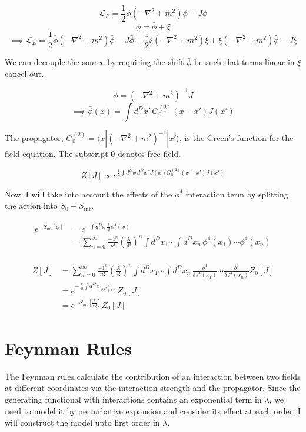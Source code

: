 $$\mathcal{L}_E=\frac{1}{2}\phi(-\nabla^2+m^2)\phi-J\phi$$
$$\phi=\bar\phi+\xi$$
$$\implies\mathcal{L}_E=\frac{1}{2}\bar\phi(-\nabla^2+m^2)\bar\phi-J\bar\phi+\frac{1}{2}\xi(-\nabla^2+m^2)\xi+\xi(-\nabla^2+m^2)\bar\phi-J\xi$$

\noindent We can decouple the source by requiring the shift $\bar\phi$ be such that terms linear in $\xi$ cancel out.

$$\bar\phi=(-\nabla^2+m^2)^{-1}J$$
$$\implies\bar\phi(x)=\int d^Dx'\,G_0^{(2)}(x-x')J(x')$$

\noindent The propagator, $G_0^{(2)}=\langle x|(-\nabla^2+m^2)^{-1}|x'\rangle$, is the Green's function for the field equation. The subscript 0 denotes free field.

$$Z[J]\propto e^{\frac{1}{2}\int d^Dx\,d^Dx'\,J(x)G_0^{(2)}(x-x')J(x')}$$

\noindent Now, I will take into account the effects of the $\phi^4$ interaction term by splitting the action into $S_0+S_\text{int}$.

\begin{align*}
    \begin{split}
        e^{-S_\text{int}[\phi]}&=e^{-\int d^Dx\,\frac{\lambda}{4!}\phi^4(x)}\\
        &=\sum_{n=0}^{\infty} \frac{-1^n}{n!}\left(\frac{\lambda}{4!}\right)^n \int d^Dx_1\cdots\int d^Dx_n\,\phi^4(x_1)\cdots\phi^4(x_n) 
    \end{split}
\end{align*}

\begin{align*}
    \begin{split}
        Z[J]&=\sum_{n=0}^{\infty} \frac{-1^n}{n!}\left(\frac{\lambda}{4!}\right)^n \int d^Dx_1\cdots\int d^Dx_n\,\frac{\delta^4}{\delta J^4(x_1)}\cdots \frac{\delta^4}{\delta J^4(x_n)}Z_0[J]\\
        &=e^{-\frac{\lambda}{4!}\int d^Dx\,\frac{\delta}{\delta J^4(x)}}Z_0[J]\\
        &=e^{-S_\text{int}\left[\frac{\delta}{\delta J}\right]} Z_0[J]
    \end{split}
\end{align*}

\section{Feynman Rules}
The Feynman rules calculate the contribution of an interaction between two fields at different coordinates via the interaction strength and the propagator. Since the generating functional with interactions contains an exponential term in $\lambda$, we need to model it by perturbative expansion and consider its effect at each order. I will construct the model upto first order in $\lambda$.\\

